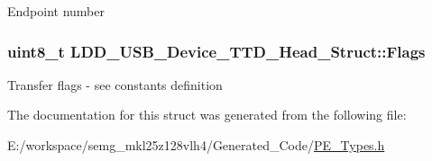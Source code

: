 Endpoint number \hypertarget{struct_l_d_d___u_s_b___device___t_t_d___head___struct_a9572bb866ff1f22ed881f3ff618c0445}{
\subsubsection[{Flags}]{\setlength{\rightskip}{0pt plus 5cm}uint8\-\_\-t L\-D\-D\-\_\-\-U\-S\-B\-\_\-\-Device\-\_\-\-T\-T\-D\-\_\-\-Head\-\_\-\-Struct\-::\-Flags}}\label{struct_l_d_d___u_s_b___device___t_t_d___head___struct_a9572bb866ff1f22ed881f3ff618c0445}
Transfer flags -\/ see constants definition 

The documentation for this struct was generated from the following file\-:\begin{DoxyCompactItemize}
\item 
E\-:/workspace/semg\-\_\-mkl25z128vlh4/\-Generated\-\_\-\-Code/\hyperlink{_p_e___types_8h}{P\-E\-\_\-\-Types.\-h}\end{DoxyCompactItemize}

